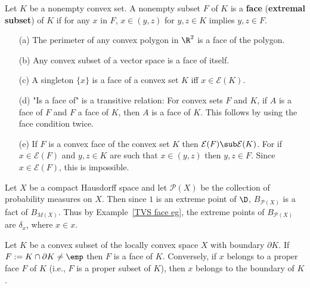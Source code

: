 \begin{definition}
Let $K$ be a nonempty convex set. A nonempty subset $F$ of $K$ is a \textbf{face} (\textbf{extremal subset}) of $K$ if for any $x$ in $F$, $x\in(y,z)$ for $y,z\in K$ implies $y,z\in F$.
\end{definition}
\begin{example}\label{TVS face eg}
\mbox{}
\begin{itemize}
\item[(a)] The perimeter of any convex polygon in $\R^2$ is a face of the polygon.
\item[(b)] Any convex subset of a vector space is a face of itself.
\item[(c)] A singleton $\{x\}$ is a face of a convex set $K$ iff $x\in\mathcal{E}(K)$.
\item[(d)] "Is a face of" is a transitive relation: For convex sets $F$ and $K$, if $A$ is a face of $F$ and $F$ a face of $K$, then $A$ is a face of $K$. This follows by using the face condition twice.
\item[(e)] If $F$ is a convex face of the convex set $K$ then $\mathcal{E}(F)\sub\mathcal{E}(K)$. For if $x\in\mathcal{E}(F)$ and $y,z\in K$ are such that $x\in (y,z)$ then $y,z\in F$. Since $x\in\mathcal{E}(F)$, this is impossible.  
\end{itemize}
\end{example}
\begin{example}
Let $X$ be a compact Hausdorff space and let $\mathcal{P}(X)$ be the collection of probability measures on $X$. Then since $1$ is an extreme point of $\D$, $B_{\mathcal{P}(X)}$ is a fact of $B_{M(X)}$. Thus by Example~\ref{TVS face eg}, the extreme points of $B_{\mathcal{P}(X)}$ are $\delta_x$, where $x\in x$.
\end{example}
\begin{proposition}\label{LCS convex face iff boundary}
Let $K$ be a convex subset of the locally convex space $X$ with boundary $\partial K$. If $F:=K\cap\partial K\neq\emp$ then $F$ is a face of $K$. Conversely, if $x$ belongs to a proper face $F$ of $K$ (i.e., $F$ is a proper subset of $K$), then $x$ belongs to the boundary of $K$.
\end{proposition}
